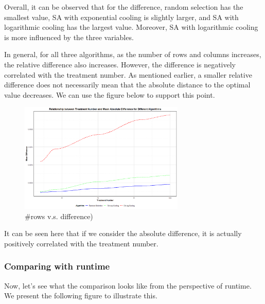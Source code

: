 \documentclass[
  a4paper,
  oneside,
  openany,
  12pt,
  onecolumn]{book}
\theoremstyle{definition}
\theoremstyle{plain}
\theoremstyle{remark}
\begin{document}
Overall, it can be observed that for the difference, random selection
has the smallest value, SA with exponential cooling is slightly larger,
and SA with logarithmic cooling has the largest value. Moreover, SA with
logarithmic cooling is more influenced by the three variables.

In general, for all three algorithms, as the number of rows and columns
increases, the relative difference also increases. However, the
difference is negatively correlated with the treatment number. As
mentioned earlier, a smaller relative difference does not necessarily
mean that the absolute distance to the optimal value decreases. We can
use the figure below to support this point.

\begin{figure}[H]

{\centering \includegraphics[width=0.7\textwidth,height=\textheight]{images/Rplots/means/trt-vs-ABS-D.png}

}

\caption{\#rows v.s. difference)}

\end{figure}%

It can be seen here that if we consider the absolute difference, it is
actually positively correlated with the treatment number.

\subsubsection{Comparing with runtime}\label{comparing-with-runtime}

Now, let's see what the comparison looks like from the perspective of
runtime. We present the following figure to illustrate this.
\end{document}
